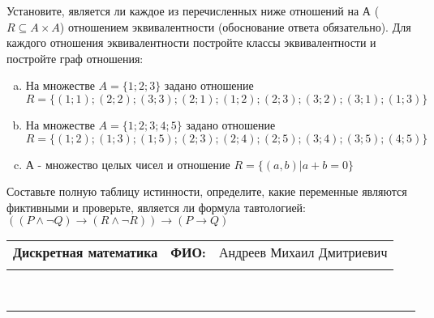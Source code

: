 \documentclass[10pt]{exam}
\newcommand{\class}{Дискретная математика}
\newcommand{\examdate}{}
\begin{document}
\begin{questions}
\question
Установите, является ли каждое из перечисленных ниже отношений на А ($R \subseteq A \times A$) отношением эквивалентности (обоснование ответа обязательно). Для каждого отношения эквивалентности постройте классы 
эквивалентности и постройте граф отношения:
\begin{enumerate} [a)]\setcounter{enumi}{0}
\item На множестве $A = \{1; 2; 3\}$ задано отношение $R = \{(1; 1); (2; 2); (3; 3); (2; 1); (1; 2); (2; 3); (3; 2); (3; 1); (1; 3)\}$
\item На множестве $A = \{1; 2; 3; 4; 5\}$ задано отношение $R = \{(1; 2); (1; 3); (1; 5); (2; 3); (2; 4); (2; 5); (3; 4); (3; 5); (4; 5)\}$
\item А - множество целых чисел и отношение $R = \{(a,b)|a + b = 0\}$
\end{enumerate}\question Составьте полную таблицу истинности, определите, какие переменные являются фиктивными и проверьте, является ли формула тавтологией:
$(( P \land \neg Q) \rightarrow (R \land \neg R)) \rightarrow (P \rightarrow Q)$

\end{questions}
\newpage
\begin{flushright}
\begin{tabular}{p{2.8in} r l}
\textbf{\class} & \textbf{ФИО:} &Андреев Михаил Дмитриевич
\\

\textbf{\examdate} &&\\
\end{tabular}\\
\end{flushright}
\rule[1ex]{\textwidth}{.1pt}
\end{document}
